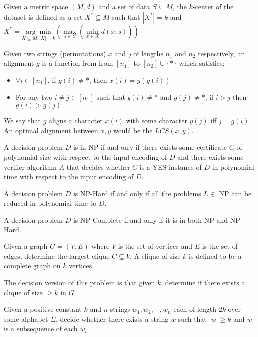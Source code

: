 \begin{definition}
\label{KCenter}
    Given a metric space $(M, d)$ and a set of data $S \subseteq M$, the $k$-center of the dataset is defined as a set $X^* \subseteq M$ such that $|X^*| = k$ and $X^* = \underset{X \subseteq M, |X| = k}{\arg \min} \left(\max\limits_{s \in S} \left(\min\limits_{x \in X} d(x, s)\right) \right)$
\end{definition}

\begin{definition}[Alignment]
\label{Alignment}
   Given two strings (permutations) $x$ and $y$ of lengths $n_1$ and $n_2$ respectively, an alignment $g$ is a function from
   from $[n_1]$ to $[n_2] \cup \{*\}$ which satisfies:
   \begin{itemize}
      \item $\forall i \in [n_1]$, if $g(i) \neq *$, then $x(i) = y(g(i))$
      \item For any two $i \neq j \in [n_1]$ such that $g(i) \neq *$ and $g(j) \neq *$, if $i > j$ then $g(i) > g(j)$ 
   \end{itemize}

   We say that $g$ aligns a character $x(i)$ with some character $y(j)$ iff $j = g(i)$.
   An optimal alignment between $x, y$ would be the $LCS(x, y)$.
\end{definition}

\begin{definition}[NP]
    A decision problem $D$ is in NP if and only if there exists some certificate $C$ of polynomial size with respect to the input encoding of $D$ and there exists some verifier algorithm $A$ that decides whether $C$ is a YES-instance of $D$ in polynomial time with respect to the input encoding of $D$.
\end{definition}

\begin{definition}[NP-Hard]
    A decision problem $D$ is NP-Hard if and only if all the problems $L \in$ NP can be reduced in polynomial time to $D$.
\end{definition}

\begin{definition}[NP-Complete]
    A decision problem $D$ is NP-Complete if and only if it is in both NP and NP-Hard.
\end{definition}

\begin{definition}
    Given a graph $G = (V, E)$ where $V$ is the set of vertices and $E$ is the set of edges, determine the largest clique $C \subseteq V$. A clique of size $k$ is defined to be a complete graph on $k$ vertices.

    The decision version of this problem is that given $k$, determine if there exists a clique of size $\geq k$ in $G$.
\end{definition}

\begin{definition}
    Given a positive constant $k$ and $n$ strings $w_1, w_2, \cdots, w_n$ each of length $2k$ over some alphabet $\Sigma$, decide whether there exists a string $w$ such that $|w| \geq k$ and $w$ is a subsequence of each $w_i$.
\end{definition}

